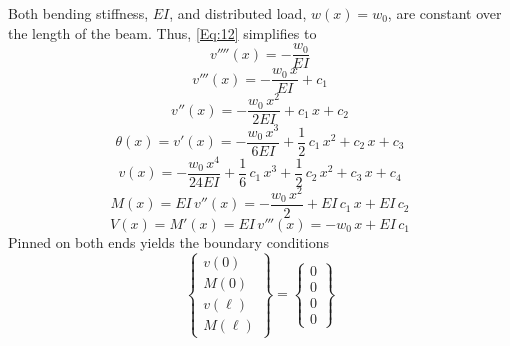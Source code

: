 \documentclass[11pt, oneside]{article}   	%
\begin{document}
Both bending stiffness, $EI$, and distributed load, $w(x) = w_0$, are constant over the length of the beam.  Thus, \eqref{Eq:12} simplifies to
\begin{equation}
   v''''(x) =  -\frac{w_0}{EI}
   \label{A1}
\end{equation}
\begin{equation}
   v'''(x) =  -\frac{w_0\,x}{EI} + c_1
   \label{A2}
\end{equation}
\begin{equation}
   v''(x) =  -\frac{w_0\,x^2}{2 EI} + c_1\,x + c_2
   \label{A3}
\end{equation}
\begin{equation}
   \theta(x) = v'(x) =  -\frac{w_0\,x^3}{6 EI} + \frac{1}{2} \,c_1\,x^2 + c_2\,x + c_3
   \label{A4}
\end{equation}
\begin{equation}
   v(x) =  -\frac{w_0\,x^4}{24 EI} + \frac{1}{6} \,c_1\,x^3 + \frac{1}{2} \,c_2\,x^2+ c_3\,x + c_4
   \label{A5}
\end{equation}
\begin{equation}
   M(x) = EI \, v''(x) = -\frac{w_0\,x^2}{2} + EI\,c_1\,x + EI\,c_2
   \label{A6}
\end{equation}
\begin{equation}
   V(x) = M'(x) = EI \, v'''(x) = -w_0\,x + EI\,c_1
   \label{A7}
\end{equation}
Pinned on both ends yields the boundary conditions
\begin{equation}
%  
   \left\{ 
   \begin{array}{c}
   v(0) \\
   M(0) \\
   v(\ell) \\
   M(\ell) 
   \end{array}
   \right\}
   =
   \left\{ 
   \begin{array}{c}
    0 \\
    0 \\
    0 \\
    0 
   \end{array}
   \right\}
   \label{A8}
\end{equation}
\end{document}

